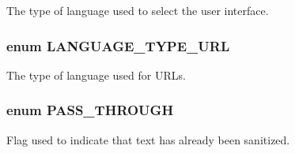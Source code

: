 \label{bootstrap_8inc_adcc8b40b0d1ee5cd37f1c7314cc541dc}
The type of language used to select the user interface. \hypertarget{bootstrap_8inc_aa234a385123b721683deb3bcbf072635}{
\subsubsection[{LANGUAGE\_\-TYPE\_\-URL}]{\setlength{\rightskip}{0pt plus 5cm}enum {\bf LANGUAGE\_\-TYPE\_\-URL}}}
\label{bootstrap_8inc_aa234a385123b721683deb3bcbf072635}
The type of language used for URLs. \hypertarget{bootstrap_8inc_a90c8d2e0e3b0f4acce7e88c8c60ddbca}{
\subsubsection[{PASS\_\-THROUGH}]{\setlength{\rightskip}{0pt plus 5cm}enum {\bf PASS\_\-THROUGH}}}
\label{bootstrap_8inc_a90c8d2e0e3b0f4acce7e88c8c60ddbca}
Flag used to indicate that text has already been sanitized.

